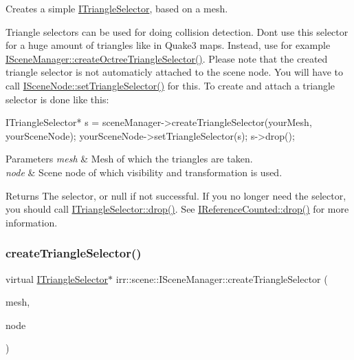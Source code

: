 Creates a simple \hyperlink{classirr_1_1scene_1_1ITriangleSelector}{I\+Triangle\+Selector}, based on a mesh. 

Triangle selectors can be used for doing collision detection. Don\textquotesingle{}t use this selector for a huge amount of triangles like in Quake3 maps. Instead, use for example \hyperlink{classirr_1_1scene_1_1ISceneManager_a4ed7d3b34f4d0c70395b6d464fe32b96}{I\+Scene\+Manager\+::create\+Octree\+Triangle\+Selector()}. Please note that the created triangle selector is not automaticly attached to the scene node. You will have to call \hyperlink{classirr_1_1scene_1_1ISceneNode_a87fb52ec54bf3ae117340d8defd1255f}{I\+Scene\+Node\+::set\+Triangle\+Selector()} for this. To create and attach a triangle selector is done like this\+: 
\begin{DoxyCode}
ITriangleSelector* s = sceneManager->createTriangleSelector(yourMesh,
        yourSceneNode);
yourSceneNode->setTriangleSelector(s);
s->drop();
\end{DoxyCode}
 
\begin{DoxyParams}{Parameters}
{\em mesh} & Mesh of which the triangles are taken. \\
\hline
{\em node} & Scene node of which visibility and transformation is used. \\
\hline
\end{DoxyParams}
\begin{DoxyReturn}{Returns}
The selector, or null if not successful. If you no longer need the selector, you should call \hyperlink{classirr_1_1IReferenceCounted_a03856a09355b89d178090c4a5f738543}{I\+Triangle\+Selector\+::drop()}. See \hyperlink{classirr_1_1IReferenceCounted_a03856a09355b89d178090c4a5f738543}{I\+Reference\+Counted\+::drop()} for more information. 
\end{DoxyReturn}
\mbox{\label{classirr_1_1scene_1_1ISceneManager_a266625379b1558e9be1dc062ea4e71f7}} 
\subsubsection{\texorpdfstring{create\+Triangle\+Selector()}{createTriangleSelector()}\hspace{0.1cm}{\footnotesize\ttfamily [2/4]}}
{\footnotesize\ttfamily virtual \hyperlink{classirr_1_1scene_1_1ITriangleSelector}{I\+Triangle\+Selector}$\ast$ irr\+::scene\+::\+I\+Scene\+Manager\+::create\+Triangle\+Selector (\begin{DoxyParamCaption}\item[{\hyperlink{classirr_1_1scene_1_1IMesh}{I\+Mesh} $\ast$}]{mesh,  }\item[{\hyperlink{classirr_1_1scene_1_1ISceneNode}{I\+Scene\+Node} $\ast$}]{node }\end{DoxyParamCaption})\hspace{0.3cm}{\ttfamily [pure virtual]}}



